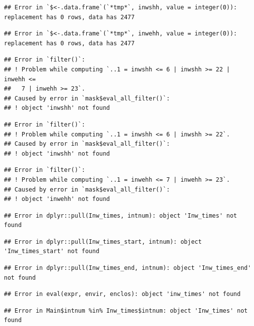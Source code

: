 \documentclass[
  11pt,
  a4paperpaper,
]{article}
\begin{document}
\begin{verbatim}
## Error in `$<-.data.frame`(`*tmp*`, inwshh, value = integer(0)): replacement has 0 rows, data has 2477
\end{verbatim}

\begin{verbatim}
## Error in `$<-.data.frame`(`*tmp*`, inwehh, value = integer(0)): replacement has 0 rows, data has 2477
\end{verbatim}

\begin{verbatim}
## Error in `filter()`:
## ! Problem while computing `..1 = inwshh <= 6 | inwshh >= 22 | inwehh <=
##   7 | inwehh >= 23`.
## Caused by error in `mask$eval_all_filter()`:
## ! object 'inwshh' not found
\end{verbatim}

\begin{verbatim}
## Error in `filter()`:
## ! Problem while computing `..1 = inwshh <= 6 | inwshh >= 22`.
## Caused by error in `mask$eval_all_filter()`:
## ! object 'inwshh' not found
\end{verbatim}

\begin{verbatim}
## Error in `filter()`:
## ! Problem while computing `..1 = inwehh <= 7 | inwehh >= 23`.
## Caused by error in `mask$eval_all_filter()`:
## ! object 'inwehh' not found
\end{verbatim}

\begin{verbatim}
## Error in dplyr::pull(Inw_times, intnum): object 'Inw_times' not found
\end{verbatim}

\begin{verbatim}
## Error in dplyr::pull(Inw_times_start, intnum): object 'Inw_times_start' not found
\end{verbatim}

\begin{verbatim}
## Error in dplyr::pull(Inw_times_end, intnum): object 'Inw_times_end' not found
\end{verbatim}

\begin{verbatim}
## Error in eval(expr, envir, enclos): object 'inw_times' not found
\end{verbatim}

\begin{verbatim}
## Error in Main$intnum %in% Inw_times$intnum: object 'Inw_times' not found
\end{verbatim}
\end{document}
